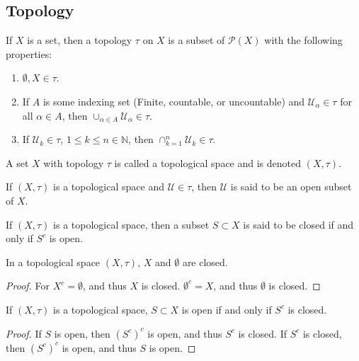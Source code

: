 \documentclass[crop=false,class=article,oneside]{standalone}
\begin{document}
        \subsection{Topology}
            \begin{definition}
            If $X$ is a set, then a topology $\tau$ on $X$ is a subset of $\mathcal{P}(X)$ with the following properties:
            \begin{enumerate}
            \item $\emptyset, X\in \tau$.
            \item If $A$ is some indexing set (Finite, countable, or uncountable) and $\mathcal{U}_\alpha \in \tau$ for all $\alpha \in A$, then $\cup_{\alpha \in A} \mathcal{U}_{\alpha} \in \tau$.
            \item If $\mathcal{U}_k\in \tau$, $1\leq k \leq n\in \mathbb{N}$, then $\cap_{k=1}^{n}\mathcal{U}_k \in \tau$.
            \end{enumerate}
            \end{definition}
            \begin{definition}
            A set $X$ with topology $\tau$ is called a topological space and is denoted $(X,\tau)$.
            \end{definition}
            \begin{definition}
            If $(X,\tau)$ is a topological space and $\mathcal{U}\in \tau$, then $\mathcal{U}$ is said to be an open subset of $X$.
            \end{definition}
            \begin{definition}
            If $(X,\tau)$ is a topological space, then a subset $S\subset X$ is said to be closed if and only if $S^c$ is open.
            \end{definition}
            \begin{theorem}
            In a topological space $(X,\tau)$, $X$ and $\emptyset$ are closed.
            \end{theorem}
            \begin{proof}
            For $X^c = \emptyset$, and thus $X$ is closed. $\emptyset^c=X$, and thus $\emptyset$ is closed.
            \end{proof}
            \begin{theorem}
            If $(X,\tau)$ is a topological space, $S\subset X$ is open if and only if $S^c$ is closed.
            \end{theorem}
            \begin{proof}
            If $S$ is open, then $(S^c)^c$ is open, and thus $S^c$ is closed. If $S^c$ is closed, then $(S^c)^c$ is open, and thus $S$ is open.
            \end{proof}
\end{document}
